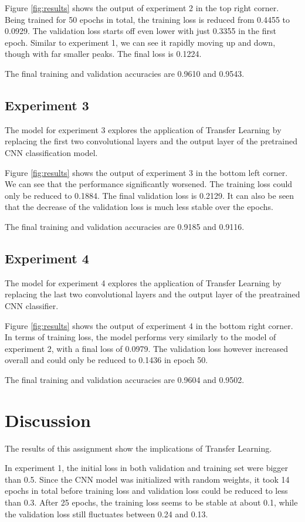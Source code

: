 \documentclass{scrartcl}
\begin{document}
Figure \ref{fig:results} shows the output of experiment 2 in the top right corner. Being trained for 50 epochs in total, the training loss is reduced from 0.4455 to 0.0929. The validation loss starts off even lower with just 0.3355 in the first epoch. Similar to experiment 1, we can see it rapidly moving up and down, though with far smaller peaks. The final loss is 0.1224.

The final training and validation accuracies are 0.9610 and 0.9543.

\subsection{Experiment 3}
The model for experiment 3 explores the application of Transfer Learning by replacing the first two convolutional layers and the output layer of the pretrained CNN classification model.

Figure \ref{fig:results} shows the output of experiment 3 in the bottom left corner. We can see that the performance significantly worsened. The training loss could only be reduced to 0.1884. The final validation loss is 0.2129. It can also be seen that the decrease of the validation loss is much less stable over the epochs.

The final training and validation accuracies are 0.9185 and 0.9116.

\subsection{Experiment 4}
The model for experiment 4 explores the application of Transfer Learning by replacing the last two convolutional layers and the output layer of the preatrained CNN classifier. 

Figure \ref{fig:results} shows the output of experiment 4 in the bottom right corner. In terms of training loss, the model performs very similarly to the model of experiment 2, with a final loss of 0.0979. The validation loss however increased overall and could only be reduced to 0.1436 in epoch 50.

The final training and validation accuracies are 0.9604 and 0.9502.

\section{Discussion}
The results of this assignment show the implications of Transfer Learning.

In experiment 1, the initial loss in both validation and training set were bigger than 0.5. Since the CNN model was initialized with random weights, it took 14 epochs in total before training loss and validation loss could be reduced to less than 0.3. After 25 epochs, the training loss seems to be stable at about 0.1, while the validation loss still fluctuates between 0.24 and 0.13.
\end{document}

